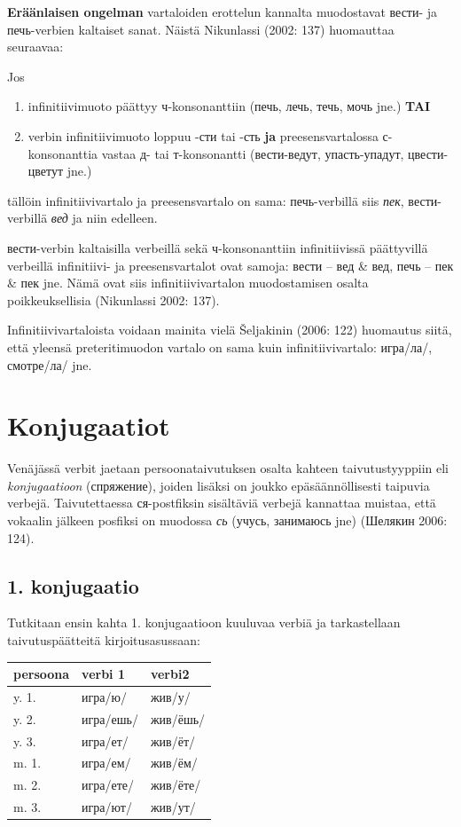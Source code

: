 \documentclass[]{scrreprt}
\providecommand{\tightlist}{%
  \setlength{\itemsep}{0pt}\setlength{\parskip}{0pt}}
\begin{document}
\textbf{Eräänlaisen ongelman} vartaloiden erottelun kannalta muodostavat
вести- ja печь-verbien kaltaiset sanat. Näistä Nikunlassi (2002: 137)
huomauttaa seuraavaa:

Jos

\begin{enumerate}
\def\labelenumi{\alph{enumi}.}
\tightlist
\item
  infinitiivimuoto päättyy ч-konsonanttiin (печь, лечь, течь, мочь jne.)
  \textbf{TAI}
\item
  verbin infinitiivimuoto loppuu -сти tai -сть \textbf{ja}
  preesensvartalossa с-konsonanttia vastaa д- tai т-konsonantti
  (вести-ведут, упасть-упадут, цвести-цветут jne.)
\end{enumerate}

tällöin infinitiivivartalo ja preesensvartalo on sama: печь-verbillä
siis \emph{пек}, вести-verbillä \emph{вед} ja niin edelleen.

вести-verbin kaltaisilla verbeillä sekä ч-konsonanttiin infinitiivissä
päättyvillä verbeillä infinitiivi- ja preesensvartalot ovat samoja:
вести -- вед \& вед, печь -- пек \& пек jne. Nämä ovat siis
infinitiivivartalon muodostamisen osalta poikkeuksellisia (Nikunlassi
2002: 137).

Infinitiivivartaloista voidaan mainita vielä Šeljakinin (2006: 122)
huomautus siitä, että yleensä preteritimuodon vartalo on sama kuin
infinitiivivartalo: игра/ла/, смотре/ла/ jne.

\section{Konjugaatiot}\label{konjugaatiot}

Venäjässä verbit jaetaan persoonataivutuksen osalta kahteen
taivutustyyppiin eli \emph{konjugaatioon} (спряжение), joiden lisäksi on
joukko epäsäännöllisesti taipuvia verbejä. Taivutettaessa ся-postfiksin
sisältäviä verbejä kannattaa muistaa, että vokaalin jälkeen posfiksi on
muodossa \emph{сь} (учусь, занимаюсь jne) (Шелякин 2006: 124).

\subsection{1. konjugaatio}\label{konjugaatio}

Tutkitaan ensin kahta 1. konjugaatioon kuuluvaa verbiä ja tarkastellaan
taivutuspäätteitä kirjoitusasussaan:

\begin{longtable}[c]{@{}lll@{}}
\toprule
persoona & verbi 1 & verbi2\tabularnewline
\midrule
\endhead
y. 1. & игра/ю/ & жив/у/\tabularnewline
y. 2. & игра/ешь/ & жив/ёшь/\tabularnewline
y. 3. & игра/ет/ & жив/ёт/\tabularnewline
m. 1. & игра/ем/ & жив/ём/\tabularnewline
m. 2. & игра/ете/ & жив/ёте/\tabularnewline
m. 3. & игра/ют/ & жив/ут/\tabularnewline
\bottomrule
\end{longtable}
\end{document}
